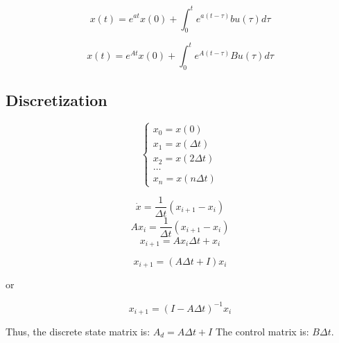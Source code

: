\[x(t) = e^{at} x(0) + \int_{0}^{t} e^{a(t-\tau)} bu(\tau) d\tau\]

\begin{tcolorbox}[colback=white]
\[x(t) = e^{At} x(0) + \int_{0}^{t} e^{A(t-\tau)} Bu(\tau) d\tau\]
\end{tcolorbox}


\subsection{Discretization}
\[
\begin{cases}
    x_0 = x(0) \\
    x_1 = x(\Delta t) \\
    x_2 = x(2\Delta t) \\
    \dots \\
    x_n = x(n\Delta t)
\end{cases}
\]

\[\dot{x} = \frac{1}{\Delta t}(x_{i+1} - x_i)\]
\[Ax_i= \frac{1}{\Delta t}(x_{i+1} - x_i)\]
\[x_{i+1} = Ax_i \Delta t + x_i\]

\begin{tcolorbox}
\[x_{i+1} = (A\Delta t + I) x_i\]
\end{tcolorbox}

or

\begin{tcolorbox}
\[x_{i+1} = (I - A\Delta t)^{-1} x_i\]
\end{tcolorbox}

Thus, the discrete state matrix is: \(A_d = A\Delta t + I\)
The control matrix is: \(B\Delta t\).